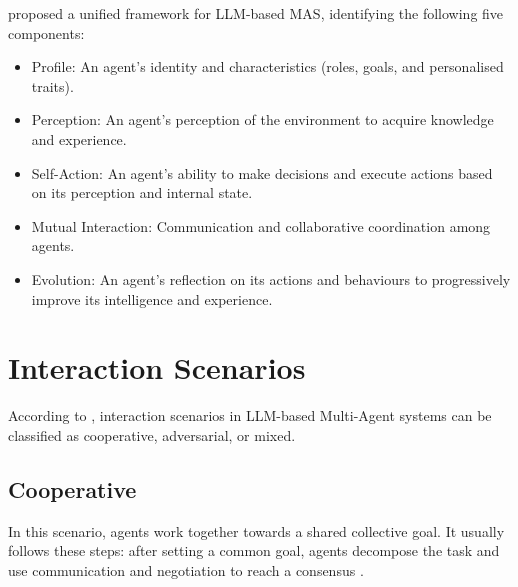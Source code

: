 

\textcite{Li2024} proposed a unified framework for \ac{LLM}-based \acs{MAS}, identifying the following five components:

\begin{itemize}
    \item Profile: An agent’s identity and characteristics (roles, goals, and personalised traits).
    \item Perception: An agent’s perception of the environment to acquire knowledge and experience.
    \item Self-Action: An agent’s ability to make decisions and execute actions based on its perception and internal state.
    \item Mutual Interaction: Communication and collaborative coordination among agents.
    \item Evolution: An agent’s reflection on its actions and behaviours to progressively improve its intelligence and experience.
\end{itemize}

\section{Interaction Scenarios}\label{sec:interaction}
According to \textcite{Li2024}, interaction scenarios in LLM-based Multi-Agent systems can be classified as cooperative, adversarial, or mixed. 

\subsection{Cooperative}

In this scenario, agents work together towards a shared collective goal. It usually follows these steps: after setting a common goal, agents decompose the task and use communication and negotiation to reach a consensus \parencite{tran2025multiagentcollaborationmechanismssurvey}. 


